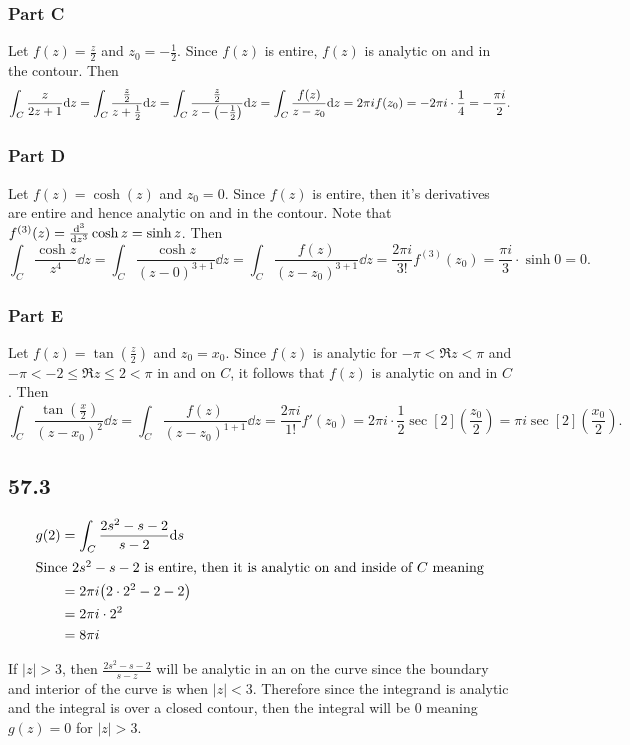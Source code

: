 \documentclass[12pt,titlepage]{extarticle}
\begin{document}
\subsubsection*{Part C}
Let $f(z) = \frac{z}{2}$ and $z_0 = -\frac{1}{2}$. Since $f(z)$ is entire, $f(z)$ is analytic on and in the contour. Then
\[
    \int_C \frac{z}{2z + 1} \dd z = \int_C \frac{\frac{z}{2}}{z + \frac{1}{2}} \dd z = \int_C \frac{\frac{z}{2}}{z - \qty(-\frac{1}{2})} \dd z = \int_C \frac{f(z)}{z - z_0} \dd z = 2 \pi i f(z_0) = -2 \pi i \cdot \frac{1}{4} = - \frac{\pi i }{2}
.\]

\subsubsection*{Part D}
Let $f(z) = \cosh(z)$ and $z_0 = 0$. Since $f(z)$ is entire, then it's derivatives are entire and hence analytic on and in the contour. Note that $f^{(3)}(z) = \dv[3]{z} \cosh z = \sinh z$. Then
\[
    \int_C \frac{\cosh z}{z^4} \dd z = \int_C \frac{\cosh z}{(z-0)^{3 + 1}} \dd z = \int_C \frac{f(z)}{(z - z_0)^{3 + 1}} \dd z = \frac{2 \pi i}{3!} f^{(3)}(z_0) = \frac{\pi i}{3} \cdot \sinh 0 = 0
.\]

\subsubsection*{Part E}
Let $f(z) = \tan(\frac{z}{2})$ and $z_0 = x_0$. Since $f(z)$ is analytic for $-\pi < \Re z < \pi$ and $-\pi < -2 \leq \Re z \leq 2 < \pi$ in and on $C$, it follows that $f(z)$ is analytic on and in $C$. Then
\[
    \int_C \frac{\tan(\frac{x}{2})}{(z-x_0)^2} \dd z = \int_C \frac{f(z)}{(z-z_0)^{1+1}} \dd z = \frac{2 \pi i}{1!} f'(z_0) = 2 \pi i \cdot \frac{1}{2} \sec[2](\frac{z_0}{2}) = \pi i \sec[2](\frac{x_0}{2})
.\]

\subsection*{57.3}
\begin{align*}
    g(2) &= \int_C \frac{2s^2 - s - 2}{s - 2} \dd s \\
    \intertext{Since $2s^2 - s - 2$ is entire, then it is analytic on and inside of $C$ meaning}
    &= 2 \pi i \qty(2 \cdot 2^2 - 2 - 2) \\
    &= 2 \pi i \cdot 2^2 \\
    &= 8 \pi i
\end{align*}

If $|z| > 3$, then $\frac{2s^2 - s - 2}{s - z}$ will be analytic in an on the curve since the boundary and interior of the curve is when $|z| < 3$. Therefore since the integrand is analytic and the integral is over a closed contour, then the integral will be $0$ meaning $g(z) = 0$ for $|z| > 3$.
\end{document}
